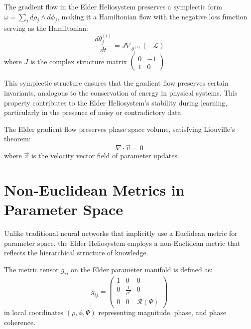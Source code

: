 \begin{theorem}
The gradient flow in the Elder Heliosystem preserves a symplectic form $\omega = \sum_j d\rho_j \wedge d\phi_j$, making it a Hamiltonian flow with the negative loss function serving as the Hamiltonian:
\begin{equation}
\frac{d\theta^{(l)}_j}{dt} = J \nabla_{\theta^{(l)}_j} (-\mathcal{L})
\end{equation}
where $J$ is the complex structure matrix $\begin{pmatrix} 0 & -1 \\ 1 & 0 \end{pmatrix}$.
\end{theorem}

This symplectic structure ensures that the gradient flow preserves certain invariants, analogous to the conservation of energy in physical systems. This property contributes to the Elder Heliosystem's stability during learning, particularly in the presence of noisy or contradictory data.

\begin{corollary}
The Elder gradient flow preserves phase space volume, satisfying Liouville's theorem:
\begin{equation}
\nabla \cdot \vec{v} = 0
\end{equation}
where $\vec{v}$ is the velocity vector field of parameter updates.
\end{corollary}

\section{Non-Euclidean Metrics in Parameter Space}

Unlike traditional neural networks that implicitly use a Euclidean metric for parameter space, the Elder Heliosystem employs a non-Euclidean metric that reflects the hierarchical structure of knowledge.

\begin{definition}
The metric tensor $g_{ij}$ on the Elder parameter manifold is defined as:
\begin{equation}
g_{ij} = \begin{pmatrix} 
1 & 0 & 0 \\
0 & \frac{1}{\rho^2} & 0 \\
0 & 0 & \mathcal{R}(\Psi)
\end{pmatrix}
\end{equation}
in local coordinates $(\rho, \phi, \Psi)$ representing magnitude, phase, and phase coherence.
\end{definition}

